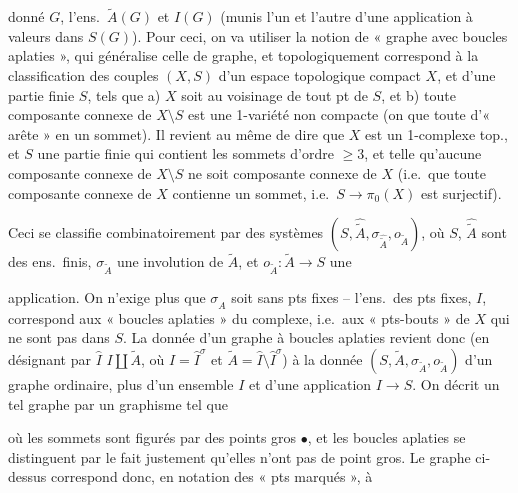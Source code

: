 \documentclass[11pt,a4paper]{article}
\begin{document}
donné $G$, l'ens.\ $\tilde{A}(G)$ et $I(G)$ (munis l'un et l'autre d'une application  à valeurs dans $S(G)$). Pour ceci, on va utiliser la notion de « graphe avec boucles aplaties », qui généralise celle de graphe, et topologiquement correspond à la classification des couples $(X,S)$ d'un espace topologique compact $X$, et d'une partie finie $S$, tels que a) $X$ soit  au voisinage de tout pt de $S$, et b) toute composante connexe de $X \setminus S$ est une 1-variété  non compacte (on  que toute  d'« arête »  en un sommet). Il revient au même de dire que $X$ est un 1-complexe top., et $S$ une partie finie qui contient les sommets d'ordre $\geq 3$, et telle qu'aucune composante connexe de $X \setminus S$ ne soit composante connexe de $X$ (i.e.\ que toute composante connexe de $X$ contienne un sommet, i.e.\ $S \to \pi_{0}(X)$ est surjectif).

Ceci se classifie combinatoirement par des systèmes $(S,\hat{\tilde{A}},\sigma_{\hat{\tilde{A}}},o_{\tilde{A}})$, où  $S$, $\hat{\tilde{A}}$ sont des ens.\ finis, $\sigma_{\tilde{A}}$ une involution de $\tilde{A}$, et $o_{\tilde{A}} : \tilde{A} \to S$ une

application. On n'exige plus que $\sigma_{\hat{A}}$ soit sans pts fixes -- l'ens.\ des pts fixes, $I$,  correspond aux « boucles aplaties » du complexe, i.e.\ aux  « pts-bouts » de $X$ qui ne sont pas dans $S$. La donnée d'un graphe à boucles aplaties revient donc (en désignant par $\hat{I}$  $I \amalg \tilde{A}$, où $I = \hat{I}^{\sigma}$ et $\tilde{A} = \hat{I} \setminus \hat{I}^{\sigma}$) à la donnée $(S,\tilde{A},\sigma_{\tilde{A}},o_{\tilde{A}})$ d'un \struck{\ill{}} graphe ordinaire, plus d'un ensemble $I$ et d'une application $I \to S$. On décrit un tel graphe  par un graphisme tel que


où les sommets sont figurés par des points gros $\bullet$, et les boucles aplaties \struck{\ill{}} se distinguent par le fait justement qu'elles n'ont pas de point gros. Le graphe  ci-dessus correspond donc, en notation des « pts marqués », à
\end{document}

